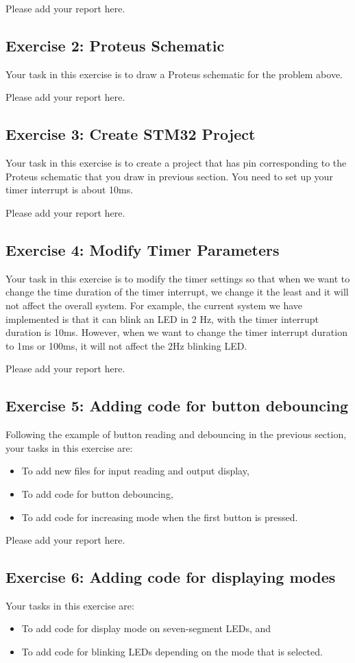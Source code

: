 Please add your report here.

\subsection{Exercise 2: Proteus Schematic}
Your task in this exercise is to draw a Proteus schematic for the problem above. 

Please add your report here.


\subsection{Exercise 3: Create STM32 Project}
Your task in this exercise is to create a project that has pin corresponding to the Proteus schematic that you draw in previous section. You need to set up your timer interrupt is about 10ms.

Please add your report here.

\subsection{Exercise 4: Modify Timer Parameters}
Your task in this exercise is to modify the timer settings so that when we want to change the time duration of the timer interrupt, we change it the least and it will not affect the overall system. For example, the current system we have implemented is that it can blink an LED in 2 Hz, with the timer interrupt duration is 10ms. However, when we want to change the timer interrupt duration to 1ms or 100ms, it will not affect the 2Hz blinking LED. 

Please add your report here.
\subsection{Exercise 5: Adding code for button debouncing}
Following the example of button reading and debouncing in the previous section, your tasks in this exercise are:
\begin{itemize}
    \item To add new files for input reading and output display,
    \item To add code for button debouncing,
    \item To add code for increasing mode when the first button is pressed. 
\end{itemize}

Please add your report here.
\newpage
\subsection{Exercise 6: Adding code for displaying modes}
Your tasks in this exercise are:
\begin{itemize}
    \item To add code for display mode on seven-segment LEDs, and
    \item To add code for blinking LEDs depending on the mode that is selected. 
\end{itemize}

